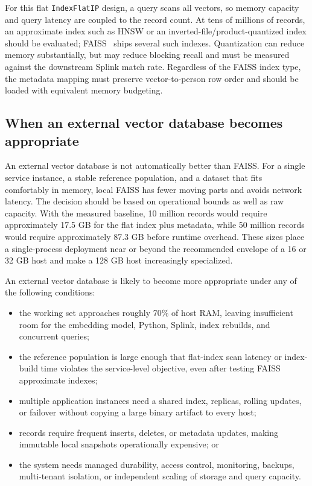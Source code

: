 \documentclass[conference]{IEEEtran}
\begin{document}
For this flat \texttt{IndexFlatIP} design, a query scans all vectors, so memory capacity and query latency are coupled to the record count. At tens of millions of records, an approximate index such as HNSW or an inverted-file/product-quantized index should be evaluated; FAISS~\cite{johnson2019} ships several such indexes. Quantization can reduce memory substantially, but may reduce blocking recall and must be measured against the downstream Splink match rate. Regardless of the FAISS index type, the metadata mapping must preserve vector-to-person row order and should be loaded with equivalent memory budgeting.

\subsection{When an external vector database becomes appropriate}
An external vector database is not automatically better than FAISS. For a single service instance, a stable reference population, and a dataset that fits comfortably in memory, local FAISS has fewer moving parts and avoids network latency. The decision should be based on operational bounds as well as raw capacity. With the measured baseline, 10 million records would require approximately 17.5 GB for the flat index plus metadata, while 50 million records would require approximately 87.3 GB before runtime overhead. These sizes place a single-process deployment near or beyond the recommended envelope of a 16 or 32 GB host and make a 128 GB host increasingly specialized.

An external vector database is likely to become more appropriate under any of the following conditions:
\begin{itemize}[leftmargin=*]
  \item the working set approaches roughly 70\% of host RAM, leaving insufficient room for the embedding model, Python, Splink, index rebuilds, and concurrent queries;
  \item the reference population is large enough that flat-index scan latency or index-build time violates the service-level objective, even after testing FAISS approximate indexes;
  \item multiple application instances need a shared index, replicas, rolling updates, or failover without copying a large binary artifact to every host;
  \item records require frequent inserts, deletes, or metadata updates, making immutable local snapshots operationally expensive; or
  \item the system needs managed durability, access control, monitoring, backups, multi-tenant isolation, or independent scaling of storage and query capacity.
\end{itemize}
\end{document}
